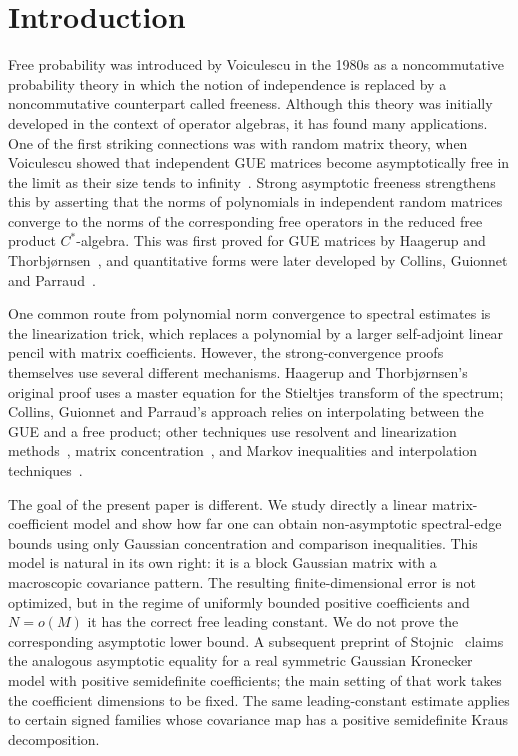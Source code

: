\documentclass{article}
\begin{document}
\section{Introduction}

Free probability was introduced by Voiculescu in the 1980s as a noncommutative probability theory in which the notion of independence is replaced by a noncommutative counterpart called freeness.  Although this theory was initially developed in the context of operator algebras, it has found many applications.
One of the first striking connections was with random matrix theory, when
Voiculescu showed that independent GUE matrices become asymptotically free in the limit as their size tends to infinity~\cite{Voiculescu1991}.
Strong asymptotic freeness strengthens this by asserting that the norms of polynomials in independent random matrices converge to the norms of the corresponding free operators in the reduced free product $C^*$-algebra.  This was first proved for GUE matrices by Haagerup and Thorbj\o rnsen~\cite{HaagerupThorbjornsen}, and quantitative forms were later developed by Collins, Guionnet and Parraud~\cite{CollinsParraudGuionnet}.

One common route from polynomial norm convergence to spectral estimates is the
linearization trick, which replaces a polynomial by a larger self-adjoint linear
pencil with matrix coefficients.  However, the strong-convergence proofs
themselves use several different mechanisms.  Haagerup and Thorbj\o rnsen's
original proof uses a master equation for the Stieltjes transform of the
spectrum; Collins, Guionnet and Parraud's approach relies on interpolating
between the GUE and a free product; other techniques use resolvent and
linearization methods~\cite{Anderson2013}, matrix
concentration~\cite{BBvH2023}, and Markov inequalities and interpolation
techniques~\cite{CGVTvHClassicalI,CGVvHClassical,vanHandelSurvey2025}.

The goal of the present paper is different.  We study directly a linear
matrix-coefficient model and show how far one can obtain non-asymptotic
spectral-edge bounds using only Gaussian concentration and comparison
inequalities.  This model is natural in its own right: it is a block Gaussian
matrix with a macroscopic covariance pattern.  The resulting finite-dimensional
error is not optimized, but in the regime of uniformly bounded positive
coefficients and $N=o(M)$ it has the correct free leading constant.  We do not
prove the corresponding asymptotic lower bound.  A subsequent preprint of
Stojnic~\cite{Stojnic2026} claims the analogous asymptotic equality for a real
symmetric Gaussian Kronecker model with positive semidefinite coefficients; the
main setting of that work takes the coefficient dimensions to be fixed.  The
same leading-constant estimate applies to
certain signed families whose covariance map has a positive semidefinite Kraus
decomposition.
\end{document}
